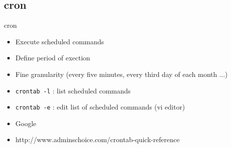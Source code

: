 \subsection{cron}

\begin{frame}[fragile]{cron}
  \begin{itemize}
    \pause \item Execute scheduled commands
    \pause \item Define period of exection
    \pause \item Fine granularity (every five minutes, every third day of each month ...)
    \pause \item \texttt{crontab -l} : list scheduled commands
    \pause \item \texttt{crontab -e} : edit list of scheduled commands (vi editor)
    \pause \item Google
    \item http://www.adminschoice.com/crontab-quick-reference
  \end{itemize}
\end{frame}


